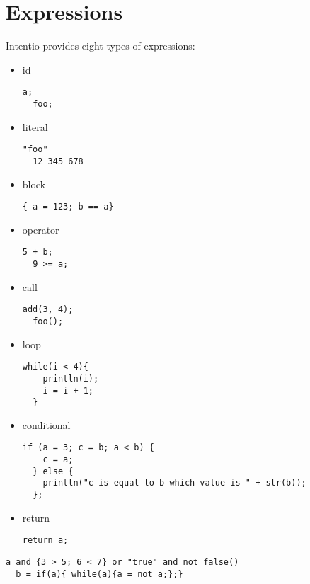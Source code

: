 \chapter{Expressions}

Intentio provides eight types of expressions:
\begin{itemize}
  \item id
\begin{lstlisting}[language=intentio]
  a;
  foo;
\end{lstlisting}
  \item literal
\begin{lstlisting}[language=intentio]
  "foo"
  12_345_678
\end{lstlisting}
  \item block
\begin{lstlisting}[language=intentio]
  { a = 123; b == a}
\end{lstlisting}
  \item operator
\begin{lstlisting}[language=intentio]
  5 + b;
  9 >= a;
\end{lstlisting}
  \item call
\begin{lstlisting}[language=intentio]
  add(3, 4);
  foo();
\end{lstlisting}
\clearpage
\item loop
\begin{lstlisting}[language=intentio]
  while(i < 4){
    println(i); 
    i = i + 1;
  }
\end{lstlisting}
  \item conditional
\begin{lstlisting}[language=intentio]
  if (a = 3; c = b; a < b) {
    c = a;
  } else {
    println("c is equal to b which value is " + str(b));
  };
\end{lstlisting}
  \item return
\begin{lstlisting}[language=intentio]
  return a;
\end{lstlisting}
\end{itemize}

\begin{example}[Combined]
\begin{lstlisting}[language=intentio]
  a and {3 > 5; 6 < 7} or "true" and not false()
  b = if(a){ while(a){a = not a;};}
\end{lstlisting}
\end{example}

